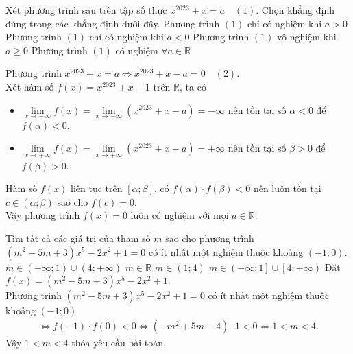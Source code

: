 \begin{ex}%
	Xét phương trình sau trên tập số thực $x^{2023}+x=a \quad(1)$. Chọn khẳng định đúng trong các khẳng định dưới đây. 
	\choice
	{Phương trình $(1)$ chỉ có nghiệm khi $a>0$}
	{Phương trình $(1)$ chỉ có nghiệm khi $a<0$}
	{Phương trình $(1)$ vô nghiệm khi $a\geq 0$}
	{\True Phương trình $(1)$ có nghiệm $\forall a\in \mathbb{R}$}
	\loigiai
	{Phương trình $x^{2023}+x=a \Leftrightarrow x^{2023}+x-a=0 \quad(2)$.\\
	Xét hàm số $f(x)=x^{2023}+x-1$ trên $\mathbb{R}$, ta có
	\begin{itemize}
		\item $\lim\limits_{x\to -\infty}f(x)=\lim\limits_{x\to -\infty}\left(x^{2023}+x-a\right)=-\infty$ nên tồn tại số $\alpha<0$ để $f(\alpha)<0$.
		\item $\lim\limits_{x\to +\infty}f(x)=\lim\limits_{x\to +\infty}\left(x^{2023}+x-a\right)=+\infty$ nên tồn tại số $\beta>0$ để $f(\beta)>0$.
	\end{itemize}
	Hàm số $f(x)$ liên tục trên $[\alpha;\beta]$, có $f(\alpha)\cdot f(\beta)<0$ nên luôn tồn tại $c\in(\alpha;\beta)$ sao cho $f(c)=0$.\\
	Vậy phương trình $f(x)=0$ luôn có nghiệm với mọi $a\in\mathbb{R}$.}
\end{ex}

\begin{ex}%
	Tìm tất cả các giá trị của tham số $m$ sao cho phương trình $(m^2-5m+3)x^5-2x^2+1=0$ có ít nhất một nghiệm thuộc khoảng $(-1;0)$.
	\choice
	{$m\in\left(-\infty;1\right)\cup\left(4;+\infty\right)$}
	{$m\in\mathbb{R}$}
	{\True $m\in\left(1;4\right)$}
	{$m\in\left(-\infty;1 \right]\cup\left[4;+\infty \right) $}
	\loigiai
	{
	Đặt $f(x)=(m^2-5m+3)x^5-2x^2+1$.\\
	Phương trình $(m^2-5m+3)x^5-2x^2+1=0$ có ít nhất một nghiệm thuộc khoảng $(-1;0)$
	\begin{eqnarray*}
		\Leftrightarrow f(-1)\cdot f(0)<0\Leftrightarrow (-m^2+5m-4)\cdot 1<0\Leftrightarrow 1<m<4.		
	\end{eqnarray*}
	Vậy $1<m<4$ thỏa yêu cầu bài toán.
	}
\end{ex}


